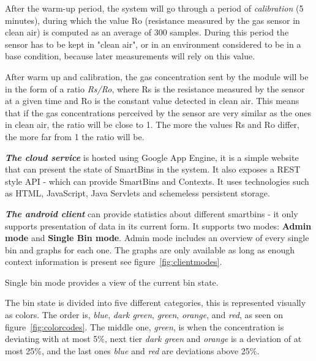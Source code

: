 After the warm-up period, the system will go through a period of \textit{calibration} (5 minutes), during which the value Ro (resistance measured by the gas sensor in clean air) is computed as an average of 300 samples.
During this period the sensor has to be kept in "clean air", or  in an environment considered to be in a base condition, because later measurements will rely on this value.

After warm up and calibration, the gas concentration sent by the module will be in the form of a ratio \textit{Rs/Ro}, where Rs is the resistance measured by the sensor at a given time and Ro is the constant value detected in clean air.
This means that if the gas concentrations perceived by the sensor are very similar as the ones in clean air, the ratio will be close to 1.
The more the values Rs and Ro differ, the more far from 1 the ratio will be.

\textit{\textbf{The cloud service}} is hosted using Google App Engine, it is a simple website that can present the state of SmartBins in the system. It also exposes a REST style API - which can provide SmartBins and Contexts.
It uses technologies such as HTML, JavaScript, Java Servlets and schemeless persistent storage.

\textit{\textbf{The android client}} can provide statistics about different smartbins - it only supports  presentation of data in its current form.
It supports two modes: \textbf{Admin mode} and \textbf{Single Bin mode}.
Admin mode includes an overview of every single bin and graphs for each one. The graphs are only available as long as enough context information is present see figure~\ref{fig:clientmodes}.

 Single bin mode provides a view of the current bin state.
 
 The bin state is divided into five different categories, this is represented visually as colors.
 The order is, \textit{blue}, \textit{dark green}, \textit{green}, \textit{orange}, and \textit{red}, as seen on figure~\ref{fig:colorcodes}.
The middle one, \textit{green}, is when the concentration is deviating with at most 5\%, next tier \textit{dark green} and \textit{orange} is a deviation of at most 25\%, and the last ones \textit{blue} and \textit{red} are deviations above 25\%.

